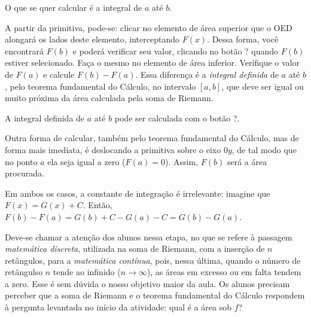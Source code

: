 \documentclass[a4paper,12pt]{scrartcl}
\begin{document}
    O que se quer calcular é a integral de $a$ até $b$.
    
    A partir da primitiva, pode-se: clicar no elemento de área superior que o OED alongará os lados deste elemento, interceptando $F(x)$. Dessa forma, você encontrará $F(b)$ e poderá verificar seu valor, clicando no botão ? quando $F(b)$ estiver selecionado. Faça o mesmo no elemento de área inferior. Verifique o valor de $F(a)$ e calcule $F(b) - F(a)$. Essa diferença é a \emph{integral definida} de $a$ até $b$, pelo teorema fundamental do Cálculo, no intervalo $[a,b]$, que deve ser igual ou muito próxima da área calculada pela soma de Riemann.
    
    A integral definida de $a$ até $b$ pode ser calculada com o botão ?.
    
    Outra forma de calcular, também pelo teorema fundamental do Cálculo, mas de forma mais imediata, é deslocando a primitiva sobre o eixo $0y$, de tal modo que no ponto $a$ ela seja igual a zero ($F(a) = 0$). Assim, $F(b)$ será a área procurada.
    
    Em ambos os casos, a constante de integração é irrelevante: imagine que $F(x) = G(x) + C$. Então, $F(b) - F(a) = G(b) + C - G(a) - C = G(b) - G(a)$.
    
    Deve-se chamar a atenção dos alunos nessa etapa, no que se refere à passagem \emph{matemática discreta}, utilizada na soma de Riemann, com a inserção de $n$ retângulos, para a \emph{matemática contínua}, pois, nessa última, quando o número de retângulso $n$ tende ao infinido ($n \to \infty$), as áreas em excesso ou em falta tendem a zero. Esse é sem dúvida o nosso objetivo maior da aula. Os alunos precisam perceber que a soma de Riemann e o teorema fundamental do Cálculo respondem à pergunta levantada no início da atividade: qual é a área sob $f$?
\end{document}

